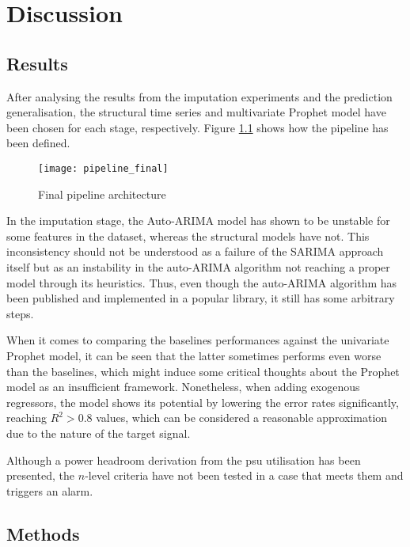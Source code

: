 \chapter{Discussion}
\label{cha:discussion}

\section{Results}
\label{sec:discussion-results}

After analysing the results from the imputation experiments and the prediction generalisation, the structural time series and multivariate Prophet model have been chosen for each stage, respectively. Figure \ref{fig:final_pipeline} shows how the pipeline has been defined. 

\begin{figure}[H]
\centering
\texttt{[image: pipeline\_final]}
\caption{Final pipeline architecture}
\label{fig:final_pipeline}
\end{figure}


In the imputation stage, the Auto-ARIMA model has shown to be unstable for some features in the dataset, whereas the structural models have not. This inconsistency should not be understood as a failure of the SARIMA approach itself but as an instability in the auto-ARIMA algorithm not reaching a proper model through its heuristics. Thus, even though the auto-ARIMA algorithm has been published and implemented in a popular library, it still has some arbitrary steps.

When it comes to comparing the baselines performances against the univariate Prophet model, it can be seen that the latter sometimes performs even worse than the baselines, which might induce some critical thoughts about the Prophet model as an insufficient framework. Nonetheless, when adding exogenous regressors, the model shows its potential by lowering the error rates significantly, reaching $R^2>0.8$ values, which can be considered a reasonable approximation due to the nature of the target signal.

Although a power headroom derivation from the \ac{psu} utilisation has been presented, the $n$-level criteria have not been tested in a case that meets them and triggers an alarm.


\section{Methods}
\label{sec:discussion-methods}

